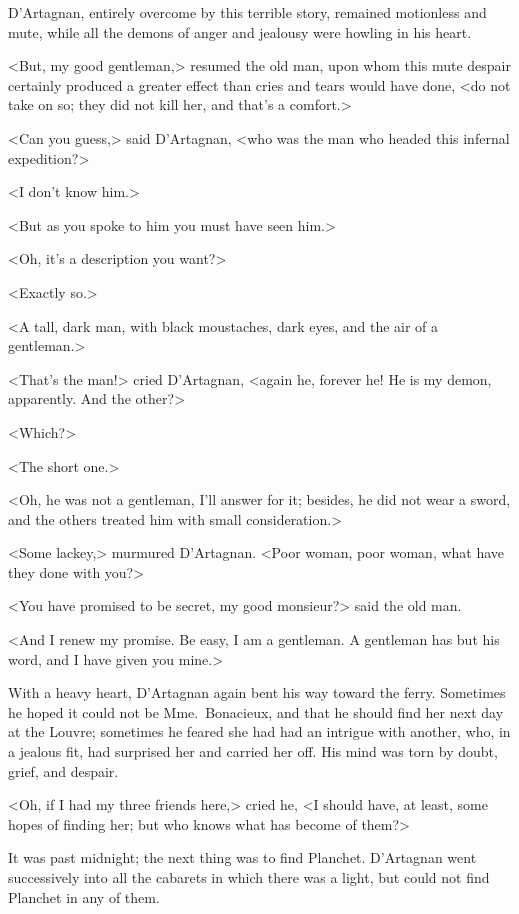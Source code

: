 D'Artagnan, entirely overcome by this terrible story, remained motionless and mute, while all the demons of anger and jealousy were howling in his heart. 

<But, my good gentleman,> resumed the old man, upon whom this mute despair certainly produced a greater effect than cries and tears would have done, <do not take on so; they did not kill her, and that's a comfort.> 

<Can you guess,> said D'Artagnan, <who was the man who headed this infernal expedition?> 

<I don't know him.> 

<But as you spoke to him you must have seen him.> 

<Oh, it's a description you want?> 

<Exactly so.> 

<A tall, dark man, with black moustaches, dark eyes, and the air of a gentleman.> 

<That's the man!> cried D'Artagnan, <again he, forever he! He is my demon, apparently. And the other?> 

<Which?> 

<The short one.> 

<Oh, he was not a gentleman, I'll answer for it; besides, he did not wear a sword, and the others treated him with small consideration.> 

<Some lackey,> murmured D'Artagnan. <Poor woman, poor woman, what have they done with you?> 

<You have promised to be secret, my good monsieur?> said the old man. 

<And I renew my promise. Be easy, I am a gentleman. A gentleman has but his word, and I have given you mine.> 

With a heavy heart, D'Artagnan again bent his way toward the ferry. Sometimes he hoped it could not be Mme.~Bonacieux, and that he should find her next day at the Louvre; sometimes he feared she had had an intrigue with another, who, in a jealous fit, had surprised her and carried her off. His mind was torn by doubt, grief, and despair. 

<Oh, if I had my three friends here,> cried he, <I should have, at least, some hopes of finding her; but who knows what has become of them?> 

It was past midnight; the next thing was to find Planchet. D'Artagnan went successively into all the cabarets in which there was a light, but could not find Planchet in any of them. 

